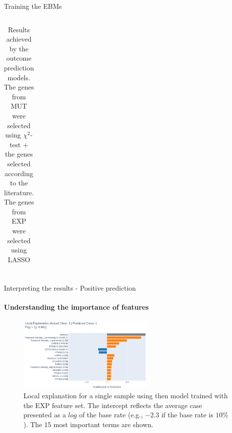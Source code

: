 \begin{frame}{Training the EBMs}
\begin{columns}
\begin{column}{0.7\textwidth}
\begin{table}[htb!]
\begin{tabular}{llrrrrr}
        \bottomrule
    \end{tabular}
     \caption{Results achieved by the outcome prediction models. The genes from MUT were selected using $\chi^2$-test + the genes selected according to the literature.  The genes from EXP were selected using LASSO}
    \end{table}
    \end{column}

    
\end{columns}
\end{frame}






\begin{frame}{Interpreting the results -  Positive prediction}
\framesubtitle{Understanding the importance of features}
        \begin{figure}[!htb]
    \begin{center}
        \includegraphics[width=0.6\textwidth]{beamerthemesrc/figs/TP_prediction.png}
    \end{center}
    \caption{\tiny Local explanation for a single sample using then model trained with the EXP feature set. The intercept reflects the average case presented as a $log$ of the base rate (e.g., $-2.3$ if the base rate is $10\%$). The 15 most important terms are shown.}
    \label{fig:prediction-interpretability}
\end{figure}
    
\end{frame}




